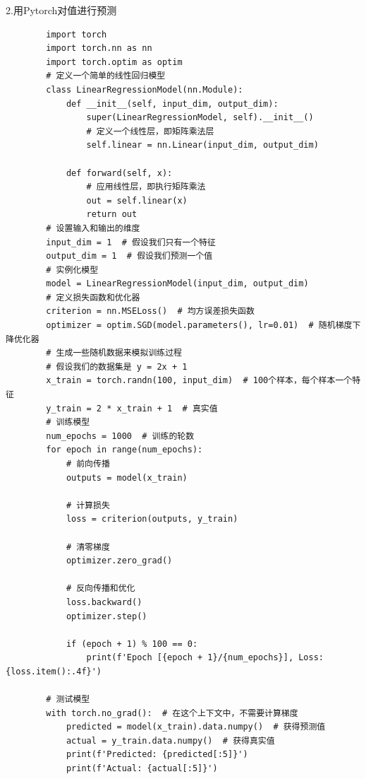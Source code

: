 \documentclass{article}
\begin{document}
2.用Pytorch对值进行预测
\begin{verbatim}
        import torch
        import torch.nn as nn
        import torch.optim as optim
        # 定义一个简单的线性回归模型
        class LinearRegressionModel(nn.Module):
            def __init__(self, input_dim, output_dim):
                super(LinearRegressionModel, self).__init__()
                # 定义一个线性层，即矩阵乘法层
                self.linear = nn.Linear(input_dim, output_dim)

            def forward(self, x):
                # 应用线性层，即执行矩阵乘法
                out = self.linear(x)
                return out
        # 设置输入和输出的维度
        input_dim = 1  # 假设我们只有一个特征
        output_dim = 1  # 假设我们预测一个值
        # 实例化模型
        model = LinearRegressionModel(input_dim, output_dim)
        # 定义损失函数和优化器
        criterion = nn.MSELoss()  # 均方误差损失函数
        optimizer = optim.SGD(model.parameters(), lr=0.01)  # 随机梯度下降优化器
        # 生成一些随机数据来模拟训练过程
        # 假设我们的数据集是 y = 2x + 1
        x_train = torch.randn(100, input_dim)  # 100个样本，每个样本一个特征
        y_train = 2 * x_train + 1  # 真实值
        # 训练模型
        num_epochs = 1000  # 训练的轮数
        for epoch in range(num_epochs):
            # 前向传播
            outputs = model(x_train)

            # 计算损失
            loss = criterion(outputs, y_train)

            # 清零梯度
            optimizer.zero_grad()

            # 反向传播和优化
            loss.backward()
            optimizer.step()

            if (epoch + 1) % 100 == 0:
                print(f'Epoch [{epoch + 1}/{num_epochs}], Loss: {loss.item():.4f}')

        # 测试模型
        with torch.no_grad():  # 在这个上下文中，不需要计算梯度
            predicted = model(x_train).data.numpy()  # 获得预测值
            actual = y_train.data.numpy()  # 获得真实值
            print(f'Predicted: {predicted[:5]}')
            print(f'Actual: {actual[:5]}')

\end{verbatim}
\end{document}
